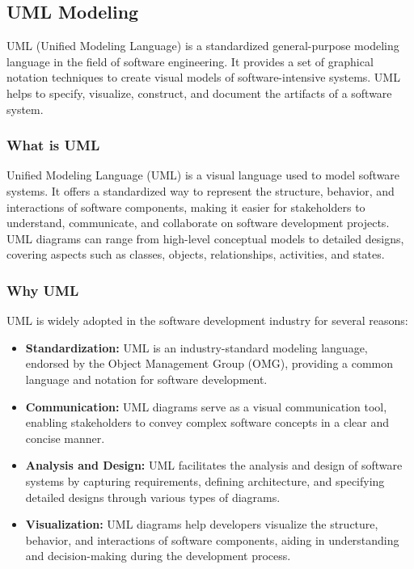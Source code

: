\subsection{UML Modeling}

UML (Unified Modeling Language) is a standardized general-purpose modeling
language in the field of software engineering. It provides a set of graphical
notation techniques to create visual models of software-intensive systems. UML
helps to specify, visualize, construct, and document the artifacts of a
software system.

\subsubsection{What is UML}

Unified Modeling Language (UML) is a visual language used to model software
systems. It offers a standardized way to represent the structure, behavior, and
interactions of software components, making it easier for stakeholders to
understand, communicate, and collaborate on software development projects. UML
diagrams can range from high-level conceptual models to detailed designs,
covering aspects such as classes, objects, relationships, activities, and
states.

\subsubsection{Why UML}

UML is widely adopted in the software development industry for several reasons:

\begin{itemize}[label=-]
      \item \textbf{Standardization:} UML is an industry-standard modeling
            language, endorsed by the Object Management Group (OMG), providing
            a
            common
            language and notation for software development.
      \item \textbf{Communication:} UML diagrams serve as a visual
            communication
            tool, enabling stakeholders to convey complex software concepts in
            a
            clear and
            concise manner.
      \item \textbf{Analysis and Design:} UML facilitates the analysis and
            design
            of software systems by capturing requirements, defining
            architecture,
            and
            specifying detailed designs through various types of diagrams.
      \item \textbf{Visualization:} UML diagrams help developers visualize the
            structure, behavior, and interactions of software components,
            aiding in
            understanding and decision-making during the development process.
\end{itemize}


